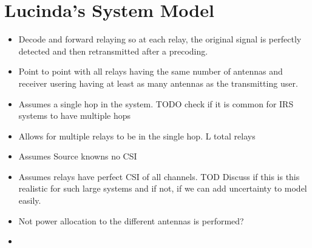 \documentclass[12pt,a4paper]{report}
\begin{document}
\section{Lucinda's System Model}
\begin{itemize}
\item Decode and forward relaying so at each relay, the original signal is perfectly detected and then retransmitted after a precoding. 
\item Point to point with all relays having the same number of antennas and receiver usering having at least as many antennas as the transmitting user.
\item Assumes a single hop in the system. TODO check if it is common for IRS systems to have multiple hops
\item Allows for multiple relays to be in the single hop. L total relays
\item Assumes Source knowns no CSI
\item Assumes relays have perfect CSI of all channels. TOD Discuss if this is this realistic for such large systems and if not, if we can add uncertainty to model easily.
\item Not power allocation to the different antennas is performed?
\item 
\end{itemize}
\end{document}
